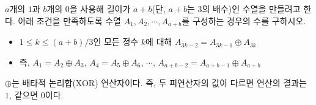 $a$개의 $1$과 $b$개의 0을 사용해 길이가 $a+b$(단, $a+b$는 3의 배수)인 수열을 만들려고 한다. 아래 조건을 만족하도록 수열 $A_1, A_2, \cdots, A_{a+b}$를 구성하는 경우의 수를 구하시오.

\begin{itemize}
    \item $1 \le k \le (a+b)/3$인 모든 정수 $k$에 대해 $A_{3k-2} = A_{3k-1} \oplus A_{3k}$
    \item 즉, $A_1 = A_2 \oplus A_3$, $A_4 = A_5 \oplus A_6$, $\cdots$, $A_{a+b-2} = A_{a+b-1} \oplus A_{a+b}$
\end{itemize}

$\oplus$는 배타적 논리합(XOR) 연산자이다. 즉, 두 피연산자의 값이 다르면 연산의 결과는 $1$, 같으면 $0$이다.